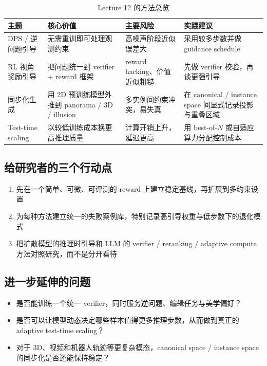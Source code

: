\documentclass[a4paper]{article}
\begin{document}
\begin{table}[H]
\centering
\begin{tabular}{p{} p{} p{} p{}}
\toprule
主题 & 核心价值 & 主要风险 & 实践建议 \\
\midrule
DPS / 逆问题引导 & 无需重训即可处理观测约束 & 高噪声阶段近似误差大 & 采用较多步数并做 guidance schedule \\
RL 视角奖励引导 & 把问题统一到 verifier + reward 框架 & reward hacking、价值近似粗糙 & 先做 verifier 校验，再谈更强引导 \\
同步化生成 & 用 2D 预训练模型外推到 panorama / 3D / illusion & 多实例间约束冲突，易失真 & 在 canonical / instance space 间显式记录投影与重叠区域 \\
Test-time scaling & 以较低训练成本换更高推理质量 & 计算开销上升，延迟更高 & 用 best-of-$N$ 或自适应算力分配控制成本 \\
\bottomrule
\end{tabular}
\caption{Lecture 12 的方法总览}
\end{table}

\subsection{给研究者的三个行动点}

\begin{enumerate}
    \item 先在一个简单、可微、可评测的 reward 上建立稳定基线，再扩展到多约束设置
    \item 为每种方法建立统一的失败案例库，特别记录高引导权重与低步数下的退化模式
    \item 把扩散模型的推理时引导和 LLM 的 verifier / reranking / adaptive compute 方法对照研究，而不是分开看待
\end{enumerate}

\subsection{进一步延伸的问题}

\begin{itemize}
    \item 是否能训练一个统一 verifier，同时服务逆问题、编辑任务与美学偏好？
    \item 是否可以让模型动态决定哪些样本值得更多推理步数，从而做到真正的 adaptive test-time scaling？
    \item 对于 3D、视频和机器人轨迹等更复杂模态，canonical space / instance space 的同步化是否还能保持稳定？
\end{itemize}
\end{document}
